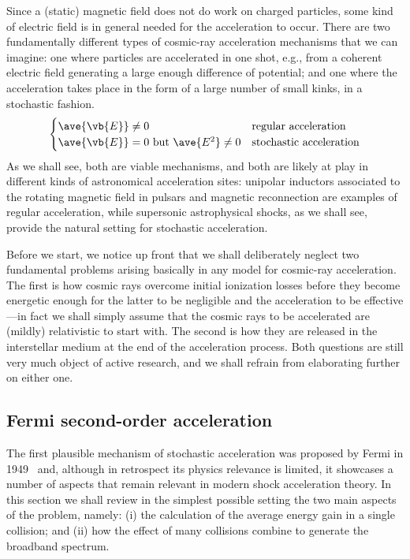 Since a (static) magnetic field does not do work on charged particles, some kind of
electric field is in general needed for the acceleration to occur. There are two
fundamentally different types of cosmic-ray acceleration mechanisms that we can
imagine: one where particles are accelerated in one shot, e.g., from a coherent
electric field generating a large enough difference of potential; and one where
the acceleration takes place in the form of a large number of small kinks, in a
stochastic fashion.
\begin{align*}
  \begin{cases}
    \ave{\vb{E}} \neq 0 & \text{regular acceleration}\\
  \ave{\vb{E}} = 0~\text{but}~\ave{E^2} \neq 0 & \text{stochastic acceleration}
  \end{cases}
\end{align*}
As we shall see, both are viable mechanisms, and both are likely at play in different
kinds of astronomical acceleration sites: unipolar inductors associated to the
rotating magnetic field in pulsars and magnetic reconnection are examples of regular
acceleration, while supersonic astrophysical shocks, as we shall
see, provide the natural setting for stochastic acceleration.

Before we start, we notice up front that we shall deliberately neglect two fundamental
problems arising basically in any model for cosmic-ray acceleration. The first is
how cosmic rays overcome initial ionization losses before they become energetic
enough for the latter to be negligible and the acceleration to be effective---in
fact we shall simply assume that the cosmic rays to be accelerated are (mildly)
relativistic to start with. The second is how they are released in the interstellar
medium at the end of the acceleration process. Both questions are still very much
object of active research, and we shall refrain from elaborating further on either one.



\subsection{Fermi second-order acceleration}

The first plausible mechanism of stochastic acceleration was proposed by Fermi in
1949~\cite{1949PhRv...75.1169F} and, although in retrospect its physics relevance
is limited, it showcases a number of aspects that remain relevant in modern shock
acceleration theory. In this section we shall review in the simplest possible setting
the two main aspects of the problem, namely: (i) the calculation of the average
energy gain in a single collision; and (ii) how the effect of many collisions combine
to generate the broadband spectrum.

